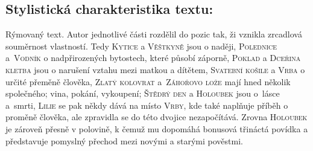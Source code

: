 \documentclass[A4paper]{extarticle} %
\begin{document}
\subsection*{Stylistická charakteristika textu:}
\noindent 
Rýmovaný text. Autor jednotlivé části rozdělil do pozic tak, ži vznikla zrcadlová souměrnost vlastností. Tedy \textsc{Kytice} a \textsc{Věštkyně} jsou o naději, \textsc{Polednice} a~\textsc{Vodník} o nadpřirozených bytostech, které působí záporně, \textsc{Poklad} a \textsc{Dceřina kletba} jsou o narušení vztahu mezi matkou a dítětem, \textsc{Svatební košile} a \textsc{Vrba} o určité přeměně člověka, \textsc{Zlatý kolovrat} a~\textsc{Záhořovo lože} mají hned několik společného; vina, pokání, vykoupení; \textsc{Štědrý den} a \textsc{Holoubek} jsou o~lásce a~smrti, \textsc{Lilie} se pak někdy dává na místo \textsc{Vrby}, kde také naplňuje příběh o proměně člověka, ale zpravidla se do této dvojice nezapočítává. Zrovna \textsc{Holoubek} je zároveň přesně v polovině, k čemuž mu dopomáhá bonusová třináctá povídka a představuje pomyslný přechod mezi novými a starými pověstmi.

\end{document}
